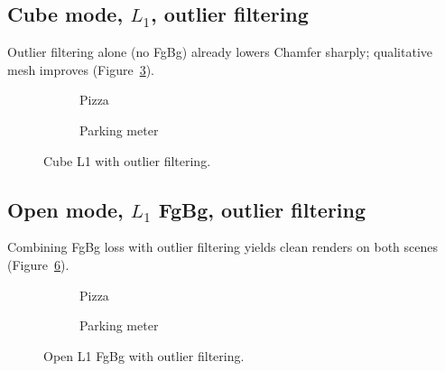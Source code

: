 \subsection{Cube mode, $L_1$, outlier filtering}
\label{subsec:ablation_cube_l1_outliers}

Outlier filtering alone (no FgBg) already lowers Chamfer sharply; qualitative mesh improves (Figure~\ref{fig:ablation_cube_l1_out}).

\begin{figure}[H]
    \centering
    \begin{subfigure}{\textwidth}
        \centering
        \caption{Pizza}
        \label{fig:ablation_cube_l1_out_pizza}
    \end{subfigure}
    \vspace{0.6em}
    \begin{subfigure}{\textwidth}
        \centering
        \caption{Parking meter}
        \label{fig:ablation_cube_l1_out_parking}
    \end{subfigure}
    \caption{Cube L1 with outlier filtering.}
    \label{fig:ablation_cube_l1_out}
\end{figure}

\subsection{Open mode, $L_1$ FgBg, outlier filtering}
\label{subsec:ablation_open_l1_fgbg_outliers}

Combining FgBg loss with outlier filtering yields clean renders on both scenes (Figure~\ref{fig:ablation_open_l1_fgbg_out}).

\begin{figure}[H]
    \centering
    \begin{subfigure}{\textwidth}
        \centering
        \caption{Pizza}
        \label{fig:ablation_open_l1_fgbg_out_pizza}
    \end{subfigure}
    \vspace{0.6em}
    \begin{subfigure}{\textwidth}
        \centering
        \caption{Parking meter}
        \label{fig:ablation_open_l1_fgbg_out_parking}
    \end{subfigure}
    \caption{Open L1 FgBg with outlier filtering.}
    \label{fig:ablation_open_l1_fgbg_out}
\end{figure}

